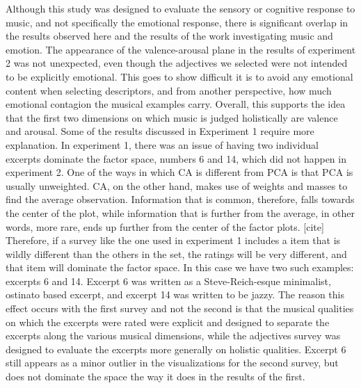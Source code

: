\documentclass[
  english,
  man,floatsintext]{apa6}
\begin{document}
Although this study was designed to evaluate the sensory or cognitive response to music, and not specifically the emotional response, there is significant overlap in the results observed here and the results of the work investigating music and emotion. The appearance of the valence-arousal plane in the results of experiment 2 was not unexpected, even though the adjectives we selected were not intended to be explicitly emotional. This goes to show difficult it is to avoid any emotional content when selecting descriptors, and from another perspective, how much emotional contagion the musical examples carry. Overall, this supports the idea that the first two dimensions on which music is judged holistically are valence and arousal.
Some of the results discussed in Experiment 1 require more explanation. In experiment 1, there was an issue of having two individual excerpts dominate the factor space, numbers 6 and 14, which did not happen in experiment 2. One of the ways in which CA is different from PCA is that PCA is usually unweighted. CA, on the other hand, makes use of weights and masses to find the average observation. Information that is common, therefore, falls towards the center of the plot, while information that is further from the average, in other words, more rare, ends up further from the center of the factor plots. {[}cite{]} Therefore, if a survey like the one used in experiment 1 includes a item that is wildly different than the others in the set, the ratings will be very different, and that item will dominate the factor space. In this case we have two such examples: excerpts 6 and 14. Excerpt 6 was written as a Steve-Reich-esque minimalist, ostinato based excerpt, and excerpt 14 was written to be jazzy. The reason this effect occurs with the first survey and not the second is that the musical qualities on which the excerpts were rated were explicit and designed to separate the excerpts along the various musical dimensions, while the adjectives survey was designed to evaluate the excerpts more generally on holistic qualities. Excerpt 6 still appears as a minor outlier in the visualizations for the second survey, but does not dominate the space the way it does in the results of the first.
\end{document}
